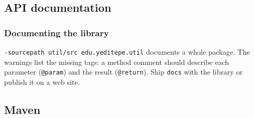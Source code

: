 \documentclass[aspectratio=169,10pt,compress]{beamer}
\begin{document}
\subsection[javadoc]{API documentation}




\begin{frame}[t,fragile] \frametitle{Documenting the library}

  \vspace{0.1em}
  \small
  \texttt{-sourcepath util/src edu.yeditepe.util} documents a whole package. The warnings list the missing tags: a method comment should
  describe each parameter (\texttt{@param}) and the result (\texttt{@return}). Ship \texttt{docs} with the library or publish it on a web site.
\end{frame}


\subsection[Maven]{Maven}
\end{document}
